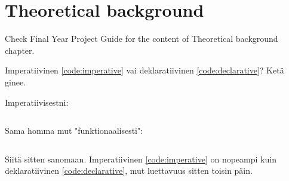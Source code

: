 \chapter{Theoretical background}

Check Final Year Project Guide for the content of Theoretical background chapter.

Imperatiivinen \ref{code:imperative} vai deklaratiivinen \ref{code:declarative}? Ketä ginee.

Imperatiivisestni: 
\begin{code} 
  \inputminted{javascript}{code/imperative.js} 
  \label{code:imperative}
\end{code}

Sama homma mut "funktionaalisesti":
\begin{code}
  \inputminted{javascript}{code/declarative.js} 
  \label{code:declarative}
\end{code}

Siitä sitten sanomaan. Imperatiivinen \ref{code:imperative} on nopeampi kuin deklaratiivinen \ref{code:declarative}, mut luettavuus sitten toisin päin.